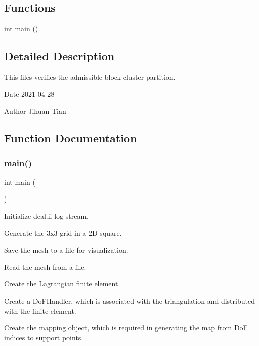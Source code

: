 \subsection*{Functions}
\begin{DoxyCompactItemize}
\item 
int \hyperlink{block-cluster-tree_8cc_ae66f6b31b5ad750f1fe042a706a4e3d4}{main} ()
\end{DoxyCompactItemize}


\subsection{Detailed Description}
This files verifies the admissible block cluster partition. 

\begin{DoxyDate}{Date}
2021-\/04-\/28 
\end{DoxyDate}
\begin{DoxyAuthor}{Author}
Jihuan Tian 
\end{DoxyAuthor}


\subsection{Function Documentation}
\mbox{\label{block-cluster-tree_8cc_ae66f6b31b5ad750f1fe042a706a4e3d4}} 
\subsubsection{\texorpdfstring{main()}{main()}}
{\footnotesize\ttfamily int main (\begin{DoxyParamCaption}{ }\end{DoxyParamCaption})}

Initialize deal.\+ii log stream.

Generate the 3x3 grid in a 2D square.

Save the mesh to a file for visualization.

Read the mesh from a file.

Create the Lagrangian finite element.

Create a Do\+F\+Handler, which is associated with the triangulation and distributed with the finite element.

Create the mapping object, which is required in generating the map from DoF indices to support points.

